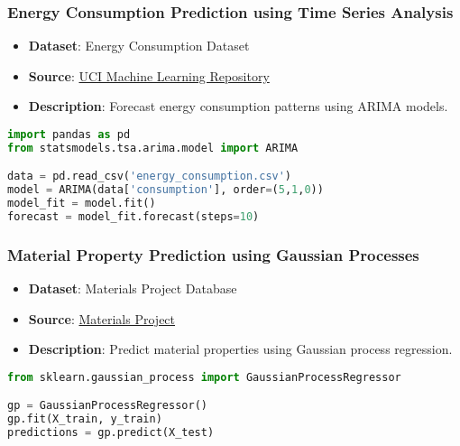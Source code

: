 \begin{frame}[fragile]\frametitle{Energy Consumption Prediction using Time Series Analysis}
    \begin{itemize}
        \item \textbf{Dataset}: Energy Consumption Dataset
        \item \textbf{Source}: \href{https://archive.ics.uci.edu/ml/datasets/Energy+consumption+of+residential+buildings}{UCI Machine Learning Repository}
        \item \textbf{Description}: Forecast energy consumption patterns using ARIMA models.
    \end{itemize}
    \begin{lstlisting}[language=Python]
import pandas as pd
from statsmodels.tsa.arima.model import ARIMA

data = pd.read_csv('energy_consumption.csv')
model = ARIMA(data['consumption'], order=(5,1,0))
model_fit = model.fit()
forecast = model_fit.forecast(steps=10)
    \end{lstlisting}
\end{frame}

\begin{frame}[fragile]\frametitle{Material Property Prediction using Gaussian Processes}
    \begin{itemize}
        \item \textbf{Dataset}: Materials Project Database
        \item \textbf{Source}: \href{https://materialsproject.org/}{Materials Project}
        \item \textbf{Description}: Predict material properties using Gaussian process regression.
    \end{itemize}
    \begin{lstlisting}[language=Python]
from sklearn.gaussian_process import GaussianProcessRegressor

gp = GaussianProcessRegressor()
gp.fit(X_train, y_train)
predictions = gp.predict(X_test)
    \end{lstlisting}
\end{frame}

